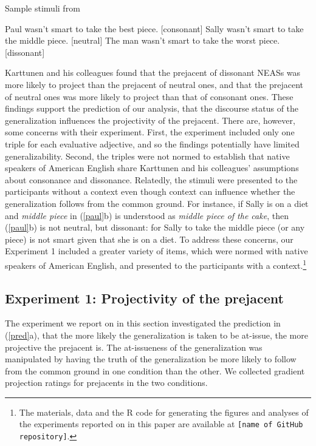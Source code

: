 \documentclass[11pt,fleqn]{article}
\newcommand{\6}{\mbox{$[\hspace*{-.6mm}[$}}
\newcommand{\9}{\mbox{$]\hspace*{-.6mm}]$}}
\begin{document}
\begin{exe}
\ex\label{paul} Sample stimuli from \citealt[241]{karttunen-etal2014}
\begin{xlist}
\ex Paul wasn't smart to take the best piece. \hfill [consonant]
\ex Sally wasn't smart to take the middle piece.  \hfill [neutral]
\ex The man wasn't smart to take the worst piece. \hfill [dissonant]
\end{xlist}
\end{exe}

Karttunen and his colleagues found that the prejacent of dissonant NEASs was more likely to project than the prejacent of neutral ones, and that the prejacent of neutral ones was more likely to project than that of consonant ones. These findings support the prediction of our analysis, that the discourse status of the generalization influences the projectivity of the prejacent. There are, however, some concerns with their experiment. First, the experiment included only one triple for each evaluative adjective, and so the findings potentially have limited generalizability. Second, the triples were not normed to establish that native speakers of American English share Karttunen and his colleagues' assumptions about consonance and dissonance. Relatedly, the stimuli were
presented to the participants without a context even though context can influence whether the generalization follows from the common ground. For instance, if Sally is on a diet and {\em middle piece} in (\ref{paul}b) is understood as {\em middle piece of the cake}, then (\ref{paul}b) is not neutral, but dissonant: for Sally to take the middle piece (or any piece) is not smart given that she is on a diet. To address these concerns, our Experiment 1 included a greater variety of items, which were normed with native speakers of American English, and presented to the participants with a context.\footnote{\label{f-git}The
materials, data and the R code for generating the figures and analyses of the experiments reported on in this paper are available at {\tt [name of GitHub repository]}.} 

\subsection{Experiment 1: Projectivity of the prejacent}\label{s31}

The experiment we report on in this section investigated the prediction in (\ref{pred}a), that the more likely the generalization is taken to be at-issue, the more projective the prejacent is. The at-issueness of the generalization was manipulated by having the truth of the generalization be more likely to follow from the common ground in one condition than the other. We collected gradient projection ratings for prejacents in the two conditions.
\end{document}
